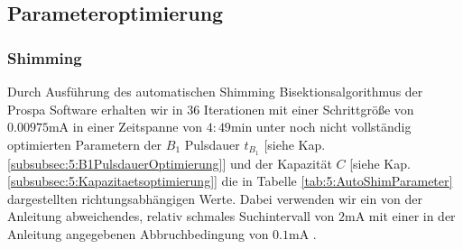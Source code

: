 \documentclass{article}
\begin{document}
    \subsection{Parameteroptimierung}\label{subsec:5:Parameteroptimierung}
        \subsubsection*{Shimming}

            Durch Ausführung des automatischen Shimming Bisektionsalgorithmus der Prospa Software \cite[ch. 2.4.3]{doc:EFNMRStudentManual} erhalten wir in $36$ Iterationen mit einer Schrittgröße von $0.00975\si{\milli\ampere}$ in einer Zeitspanne von $4:49$min unter noch nicht vollständig optimierten Parametern der $B_1$ Pulsdauer $t_{B_1}$ [siehe Kap. \ref{subsubsec:5:B1PulsdauerOptimierung}] und der Kapazität $C$ [siehe Kap. \ref{subsubsec:5:Kapazitaetsoptimierung}] die in Tabelle \ref{tab:5:AutoShimParameter} dargestellten richtungsabhängigen Werte. Dabei verwenden wir ein von der Anleitung abweichendes, relativ schmales Suchintervall von $2\si{\milli\ampere}$ mit einer in der Anleitung angegebenen Abbruchbedingung von $0.1\si{\milli\ampere}$ \cite[ch 2.4.3]{doc:EFNMRStudentManual}. 
\end{document}
